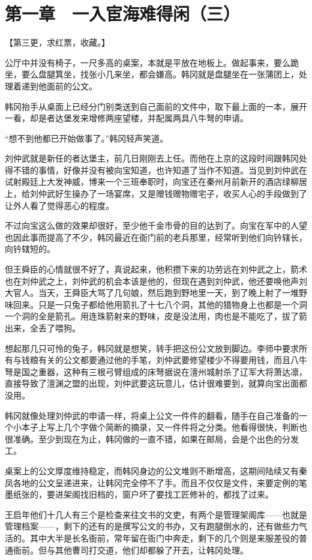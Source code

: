 \section{第一章　一入宦海难得闲（三）}

【第三更，求红票，收藏。】

公厅中并没有椅子，一尺多高的桌案，本就是平放在地板上。做起事来，要么跪坐，要么盘腿箕坐，找张小几来坐，都会嫌高。韩冈就是盘腿坐在一张蒲团上，处理着递到他面前的公文。

韩冈抬手从桌面上已经分门别类送到自己面前的文件中，取下最上面的一本，展开一看，却是者达堡发来增修两座望楼，并配属两具八牛弩的申请。

“想不到他都已开始做事了。”韩冈轻声笑道。

刘仲武就是新任的者达堡主，前几日刚刚去上任。而他在上京的这段时间跟韩冈处得不错的事情，好像并没有被向宝知道，也许知道了当作不知道。当见到刘仲武在试射殿廷上大发神威，博来一个三班奉职时，向宝还在秦州月前新开的酒店绿柳居上，给刘仲武好生操办了一场宴席，又是赠钱赠物赠宅子，收买人心的手段做到了让外人看了觉得恶心的程度。

不过向宝这么做的效果却很好，至少他千金市骨的目的达到了。向宝在军中的人望也因此事而提高了不少，韩冈最近在衙门前的老兵那里，经常听到他们向钤辖长，向钤辖短的。

但王舜臣的心情就很不好了，真说起来，他积攒下来的功劳远在刘仲武之上，箭术也在刘仲武之上，刘仲武的机会本该是他的，但现在遇到刘仲武，他还要唤他声刘大官人。当天，王舜臣大骂了几句娘，然后跑到野地里一天，到了晚上射了一堆野味回来。只是一只兔子都给他用箭扎了十七八个洞，其他的猎物身上也都是一个洞一个洞的全是箭孔。用连珠箭射来的野味，皮是没法用，肉也是不能吃了，拔了箭出来，全丢了喂狗。

想起那几只可怜的兔子，韩冈就是想笑，转手把这份公文放到脚边。李师中要求所有与钱粮有关的公文都要通过他的手笔，刘仲武要修望楼少不得要用钱，而且八牛弩是国之重器，这种有三根弓臂组成的床弩据说在澶州城射杀了辽军大将萧达凛，直接导致了澶渊之盟的出现，刘仲武要这玩意儿，估计很难要到，就算向宝出面都没用。

韩冈就像处理刘仲武的申请一样，将桌上公文一件件的翻看，随手在自己准备的一个小本子上写上几个字做个简断的摘录，又一件件将之分类。他看得很快，判断也很准确。至少到现在为止，韩冈做的一直不错，如果在邮局，会是个出色的分发工。

桌案上的公文厚度维持稳定，而韩冈身边的公文堆则不断增高，这期间陆续又有秦凤各地的公文呈递进来，让韩冈完全停不了手。而且不仅仅是文件，来要定例的笔墨纸张的，要进架阁找旧档的，窗户坏了要找工匠修补的，都找了过来。

王启年他们十几人有三个是检查来往文书的文吏，有两个是管理架阁库——也就是管理档案——，剩下的还有的是撰写公文的书办，又有跑腿倒水的，还有做些力气活的。其中大半是长名衙前，常年留在衙门中奔走，剩下的几个则是来服差役的普通衙前。但与其他曹司打交道，他们却都躲了开去，让韩冈处理。

